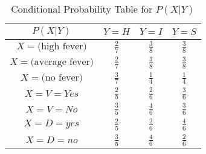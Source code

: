 \documentclass[a3paper,12pt]{article} %
\begin{document}
\begin{enumerate}
    \begin{table}[h]
    \centering
    \begin{tabular}{|c|c|c|c|}
    \hline
    \( P(X|Y) \) & \( Y = H \) & \( Y = I \) & \( Y = S \) \\
    \hline
    \( X = \text{(high fever)} \) & \(\frac{2}{7}\) & \(\frac{3}{8}\)  & \(\frac{3}{8}\) \\
    \( X = \text{(average fever)} \) & \(\frac{2}{7}\) & \(\frac{3}{8}\)  & \(\frac{3}{8}\) \\
    \( X = \text{(no fever)} \) & \(\frac{3}{7}\) & \(\frac{1}{4}\)  & \(\frac{1}{4}\) \\
    \( X = V = Yes \) &  \(\frac{2}{5}\) & \(\frac{2}{6}\) & \(\frac{3}{6}\) \\
    \( X = V = No \) &  \(\frac{3}{5}\) & \(\frac{4}{6}\) & \(\frac{3}{6}\) \\
    \( X = D = yes \) & \(\frac{2}{5}\)  & \(\frac{2}{6}\) & \(\frac{4}{6}\) \\
    \( X = D = no \) & \(\frac{3}{5}\)  & \(\frac{4}{6}\) & \(\frac{2}{6}\) \\
    \hline
    \end{tabular}
    \caption{Conditional Probability Table for \( P(X|Y) \)}
    \label{tab:conditional_probs}
    \end{table}


\end{enumerate}
\end{document}
